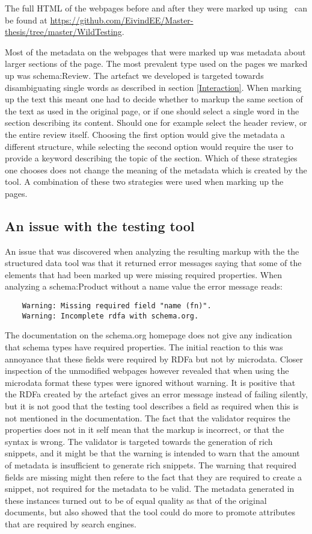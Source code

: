 The full HTML of the webpages before and after they were marked up using \theartefact\ can be found at
\url{https://github.com/EivindEE/Master-thesis/tree/master/WildTesting}.

Most of the metadata on the webpages that were marked up was metadata about larger sections of the page.
The most prevalent type used on the pages we marked up was schema:Review.
The artefact we developed is targeted towards disambiguating single words as described in section \ref{Interaction}.
When marking up the text this meant one had to decide whether to markup the same section of the text as used in the original page,
or if one should select a single word in the section describing its content.
Should one for example select the header review, or the entire review itself.
Choosing the first option would give the metadata a different structure,
while selecting the second option would require the user to provide a keyword describing the topic of the section.
Which of these strategies one chooses does not change the meaning of the metadata which is created by the tool.
A combination of these two strategies were used when marking up the pages.

\subsection{An issue with the testing tool}
An issue that was discovered when analyzing the resulting markup with the the structured data tool was that
it returned  error messages saying that some of the elements that had been marked up were missing required properties.
When analyzing a schema:Product without a name value the error message reads:

\begin{verbatim}
	Warning: Missing required field "name (fn)".
	Warning: Incomplete rdfa with schema.org.
\end{verbatim}

The documentation on the schema.org homepage does not give any indication that schema types have required properties.
The initial reaction to this was annoyance that these fields were required by RDFa but not by microdata.
Closer inspection of the unmodified webpages however revealed that when using the microdata format these types
were ignored without warning.
It is positive that the RDFa created by the artefact gives an error message instead of failing silently,
but it is not good that the testing tool describes a field as required when this is not mentioned in the documentation.
The fact that the validator requires the properties does not in it self mean that the markup is incorrect,
or that the syntax is wrong.
The validator is targeted towards the generation of rich snippets,
and it might be that the warning is intended to warn that the amount of metadata is insufficient to generate rich snippets.
The warning that required fields are missing might then refere to the fact that they are required to create a snippet,
not required for the metadata to be valid.
The metadata generated in these instances turned out to be of equal quality as that of the original documents,
but also showed that the tool could do more to promote attributes that are required by search engines.

